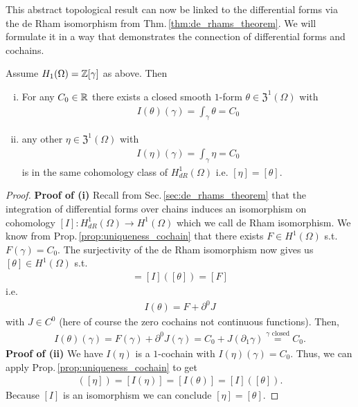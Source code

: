 \documentclass[../main.tex]{subfiles}
\begin{document}
This abstract topological result can now be linked to the differential 
forms via the de Rham isomorphism from Thm.\,\ref{thm:de_rhams_theorem}. 
We will formulate it in a way 
that demonstrates the connection of differential forms and cochains.
\begin{corollary}\label{cor:existence_uniqueness_1form}
    Assume $H_1(\Omega) = \mathbb{Z} [\gamma]$ as above. Then
    \begin{enumerate}[(i)]
        \item For any $C_0 \in \mathbb{R}$ there exists a closed smooth $1$-form 
            $\theta \in \mathfrak{Z}^1(\Omega)$ with 
            \begin{align*}
                I(\theta)(\gamma) = \int_\gamma \theta = C_0
            \end{align*}
        \item any other $\eta \in \mathfrak{Z}^1(\Omega)$ with 
            \begin{align*}
                I(\eta)(\gamma) = \int_\gamma \eta = C_0
            \end{align*}
            is in the same cohomology class of $H_{dR}^1(\Omega)$ 
            i.e. $[\eta] = [\theta]$.
    \end{enumerate}
\end{corollary}

\begin{proof}
    \textbf{Proof of (i)}
    Recall from Sec.\,\ref{sec:de_rhams_theorem} 
    that the integration of differential forms 
    over chains induces an isomorphism on cohomology 
    $[I]: H_{dR}^1(\Omega) \rightarrow H^1(\Omega)$ which we call 
    de Rham isomorphism. We know from 
    Prop.\,\ref{prop:uniqueness_cochain} that there exists $F\in H^1(\Omega)$ 
    s.t. $F(\gamma) = C_0$. The surjectivity of the de Rham isomorphism 
    now gives us $[\theta] \in H^1(\Omega)$ s.t.
    \begin{align*}
        [I(\theta)] = [I]([\theta]) = [F]
    \end{align*}
    i.e.
    \begin{align*}
        I(\theta) = F + \partial^0 J
    \end{align*}
    with $J \in C^0$ (here of course the zero cochains not continuous functions). 
    Then, 
    \begin{align*}
        I(\theta)(\gamma) = F(\gamma) + \partial^0 J(\gamma) 
        = C_0 + J(\partial_1 \gamma) 
        \stackrel{\text{$\gamma$ closed}}{=} C_0. 
    \end{align*}
    \textbf{Proof of (ii)}
    We have $I(\eta)$ is a $1$-cochain with $I(\eta)(\gamma) = C_0$.
    Thus, we can apply Prop.\,\ref{prop:uniqueness_cochain} to get
    \begin{align*}
        [I]([\eta])=[I(\eta)] = [I(\theta)]=[I]([\theta]).
    \end{align*}
    Because $[I]$ is an isomorphism we can conclude $[\eta] = [\theta]$.
\end{proof}
\end{document}
